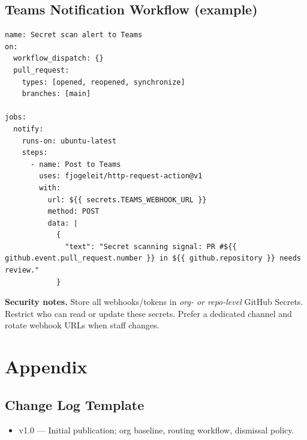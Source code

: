 \documentclass[11pt,a4paper,oneside,notitlepage]{article}
\begin{document}
\subsection{Teams Notification Workflow (example)}
\begin{listing}[h]
\caption{GitHub Actions workflow: Post signal to Microsoft Teams}
\label{lst:teams-workflow}
\begin{verbatim}
name: Secret scan alert to Teams
on:
  workflow_dispatch: {}
  pull_request:
    types: [opened, reopened, synchronize]
    branches: [main]

jobs:
  notify:
    runs-on: ubuntu-latest
    steps:
      - name: Post to Teams
        uses: fjogeleit/http-request-action@v1
        with:
          url: ${{ secrets.TEAMS_WEBHOOK_URL }}
          method: POST
          data: |
            {
              "text": "Secret scanning signal: PR #${{ github.event.pull_request.number }} in ${{ github.repository }} needs review."
            }
\end{verbatim}
\end{listing}

\begin{tcolorbox}
\textbf{Security notes.} Store all webhooks/tokens in \emph{org- or repo-level} GitHub Secrets. Restrict who can read or update these secrets. Prefer a dedicated channel and rotate webhook URLs when staff changes.
\end{tcolorbox}

\section{Appendix}
\subsection*{Change Log Template}
\begin{itemize}
  \item v1.0 --- Initial publication; org baseline, routing workflow, dismissal policy.
\end{itemize}
\end{document}
